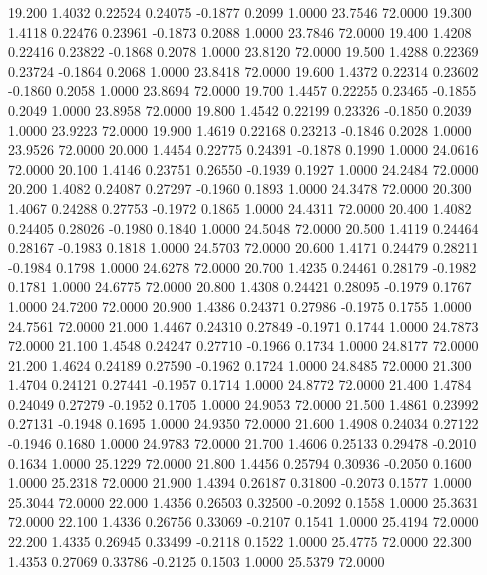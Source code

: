   19.200   1.4032   0.22524   0.24075  -0.1877   0.2099   1.0000  23.7546  72.0000
  19.300   1.4118   0.22476   0.23961  -0.1873   0.2088   1.0000  23.7846  72.0000
  19.400   1.4208   0.22416   0.23822  -0.1868   0.2078   1.0000  23.8120  72.0000
  19.500   1.4288   0.22369   0.23724  -0.1864   0.2068   1.0000  23.8418  72.0000
  19.600   1.4372   0.22314   0.23602  -0.1860   0.2058   1.0000  23.8694  72.0000
  19.700   1.4457   0.22255   0.23465  -0.1855   0.2049   1.0000  23.8958  72.0000
  19.800   1.4542   0.22199   0.23326  -0.1850   0.2039   1.0000  23.9223  72.0000
  19.900   1.4619   0.22168   0.23213  -0.1846   0.2028   1.0000  23.9526  72.0000
  20.000   1.4454   0.22775   0.24391  -0.1878   0.1990   1.0000  24.0616  72.0000
  20.100   1.4146   0.23751   0.26550  -0.1939   0.1927   1.0000  24.2484  72.0000
  20.200   1.4082   0.24087   0.27297  -0.1960   0.1893   1.0000  24.3478  72.0000
  20.300   1.4067   0.24288   0.27753  -0.1972   0.1865   1.0000  24.4311  72.0000
  20.400   1.4082   0.24405   0.28026  -0.1980   0.1840   1.0000  24.5048  72.0000
  20.500   1.4119   0.24464   0.28167  -0.1983   0.1818   1.0000  24.5703  72.0000
  20.600   1.4171   0.24479   0.28211  -0.1984   0.1798   1.0000  24.6278  72.0000
  20.700   1.4235   0.24461   0.28179  -0.1982   0.1781   1.0000  24.6775  72.0000
  20.800   1.4308   0.24421   0.28095  -0.1979   0.1767   1.0000  24.7200  72.0000
  20.900   1.4386   0.24371   0.27986  -0.1975   0.1755   1.0000  24.7561  72.0000
  21.000   1.4467   0.24310   0.27849  -0.1971   0.1744   1.0000  24.7873  72.0000
  21.100   1.4548   0.24247   0.27710  -0.1966   0.1734   1.0000  24.8177  72.0000
  21.200   1.4624   0.24189   0.27590  -0.1962   0.1724   1.0000  24.8485  72.0000
  21.300   1.4704   0.24121   0.27441  -0.1957   0.1714   1.0000  24.8772  72.0000
  21.400   1.4784   0.24049   0.27279  -0.1952   0.1705   1.0000  24.9053  72.0000
  21.500   1.4861   0.23992   0.27131  -0.1948   0.1695   1.0000  24.9350  72.0000
  21.600   1.4908   0.24034   0.27122  -0.1946   0.1680   1.0000  24.9783  72.0000
  21.700   1.4606   0.25133   0.29478  -0.2010   0.1634   1.0000  25.1229  72.0000
  21.800   1.4456   0.25794   0.30936  -0.2050   0.1600   1.0000  25.2318  72.0000
  21.900   1.4394   0.26187   0.31800  -0.2073   0.1577   1.0000  25.3044  72.0000
  22.000   1.4356   0.26503   0.32500  -0.2092   0.1558   1.0000  25.3631  72.0000
  22.100   1.4336   0.26756   0.33069  -0.2107   0.1541   1.0000  25.4194  72.0000
  22.200   1.4335   0.26945   0.33499  -0.2118   0.1522   1.0000  25.4775  72.0000
  22.300   1.4353   0.27069   0.33786  -0.2125   0.1503   1.0000  25.5379  72.0000
